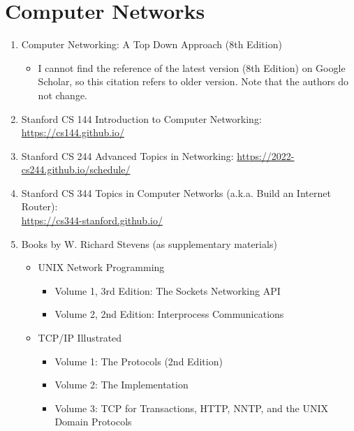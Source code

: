 \documentclass{article}
\begin{document}
\section{Computer Networks}
\begin{enumerate}
    \item Computer Networking: A Top Down Approach (8th Edition) \cite{kurosecomputer}
    \begin{itemize}
        \item I cannot find the reference of the latest version (8th Edition) on Google Scholar, so this citation refers to older version.
        Note that the authors do not change.
    \end{itemize}
    \item Stanford CS 144 Introduction to Computer Networking:
    \href{https://cs144.github.io/}{https://cs144.github.io/}
    \item Stanford CS 244 Advanced Topics in Networking:
    \href{https://2022-cs244.github.io/schedule/}{https://2022-cs244.github.io/schedule/}
    \item Stanford CS 344 Topics in Computer Networks (a.k.a. Build an Internet Router):\\
    \href{https://cs344-stanford.github.io/}{https://cs344-stanford.github.io/}
    \item Books by W. Richard Stevens (as supplementary materials)
    \begin{itemize}
        \item UNIX Network Programming
        \begin{itemize}
            \item Volume 1, 3rd Edition: The Sockets Networking API \cite{stevens2018unixvolume1}
            \item Volume 2, 2nd Edition: Interprocess Communications \cite{richard1999unixvolume2}
        \end{itemize}
        \item TCP/IP Illustrated
        \begin{itemize}
            \item Volume 1: The Protocols (2nd Edition) \cite{fall2011tcp}
            \item Volume 2: The Implementation \cite{stevens1996tcp}
            \item Volume 3: TCP for Transactions, HTTP, NNTP, and the UNIX Domain Protocols \cite{stevens2000tcp}
        \end{itemize}
    \end{itemize}

\end{enumerate}
\end{document}
